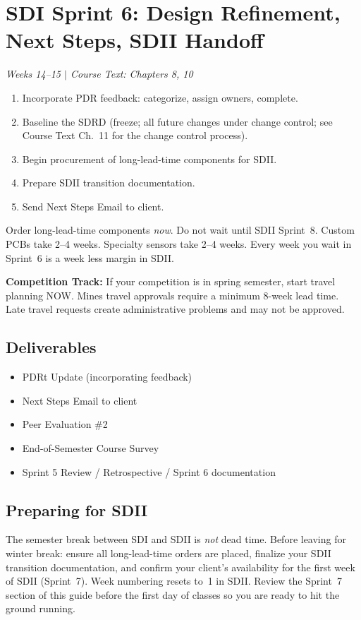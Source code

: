 \section{SDI Sprint 6: Design Refinement, Next Steps, SDII Handoff}
\textit{Weeks 14--15 $|$ Course Text: Chapters 8, 10}

\begin{priorities}
\begin{enumerate}[nosep]
\item Incorporate PDR feedback: categorize, assign owners, complete.
\item Baseline the SDRD (freeze; all future changes under change control; see Course Text Ch.~11 for the change control process).
\item Begin procurement of long-lead-time components for SDII.
\item Prepare SDII transition documentation.
\item Send Next Steps Email to client.
\end{enumerate}
\end{priorities}

\begin{protip}
Order long-lead-time components \emph{now}. Do not wait until SDII Sprint~8. Custom PCBs take 2--4 weeks. Specialty sensors take 2--4 weeks. Every week you wait in Sprint~6 is a week less margin in SDII.
\end{protip}

\begin{warnbox}
\textbf{Competition Track:} If your competition is in spring semester, start travel planning NOW. Mines travel approvals require a minimum 8-week lead time. Late travel requests create administrative problems and may not be approved.
\end{warnbox}

\subsection{Deliverables}
\begin{itemize}[nosep,leftmargin=1.5em]
\item PDRt Update (incorporating feedback)
\item Next Steps Email to client
\item Peer Evaluation \#2
\item End-of-Semester Course Survey
\item Sprint 5 Review / Retrospective / Sprint 6 documentation
\end{itemize}

\subsection{Preparing for SDII}
The semester break between SDI and SDII is \emph{not} dead time. Before leaving for winter break: ensure all long-lead-time orders are placed, finalize your SDII transition documentation, and confirm your client's availability for the first week of SDII (Sprint~7). Week numbering resets to~1 in SDII. Review the Sprint~7 section of this guide before the first day of classes so you are ready to hit the ground running.

